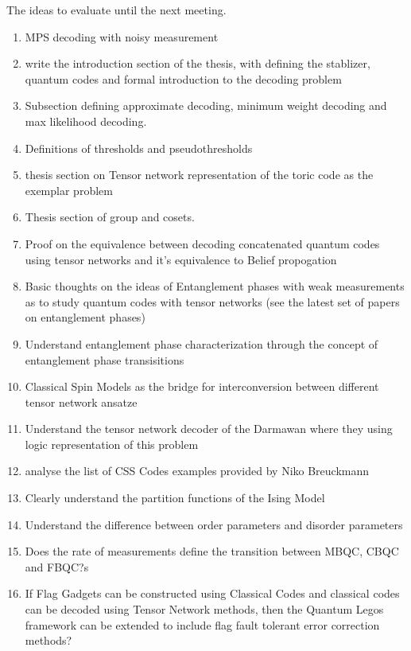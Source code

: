 \documentclass[%
 reprint,
amsmath,amssymb,
aps,
onecolumn,
]{revtex4-2}
\begin{document}
The ideas to evaluate until the next meeting.
\begin{enumerate}
    \item MPS decoding with noisy measurement
    \item write the introduction section of the thesis, with defining the stablizer, quantum codes and formal introduction to the decoding problem
    \item Subsection defining approximate decoding, minimum weight decoding and max likelihood decoding. 
    \item Definitions of thresholds and pseudothresholds
    \item thesis section on Tensor network representation of the toric code as the exemplar problem
    \item Thesis section of group and cosets.
    \item Proof on the equivalence between decoding concatenated quantum codes using tensor networks and it's equivalence to Belief propogation
    \item Basic thoughts on the ideas of Entanglement phases with weak measurements as to study quantum codes with tensor networks (see the latest set of papers on entanglement phases)
    \item Understand entanglement phase characterization through the concept of entanglement phase transisitions
    \item Classical Spin Models as the bridge for interconversion between different tensor network ansatze
    \item Understand the tensor network decoder of the Darmawan where they using logic representation of this problem
    \item analyse the list of CSS Codes examples provided by Niko Breuckmann
    \item Clearly understand the partition functions of the Ising Model 
    \item Understand the difference between order parameters and disorder parameters
    \item Does the rate of measurements define the transition between MBQC, CBQC and FBQC?s
    \item If Flag Gadgets can be constructed using Classical Codes and classical codes can be decoded using Tensor Network methods, then the Quantum Legos framework can be extended to include flag fault tolerant error correction methods?
\end{enumerate}
\end{document}
